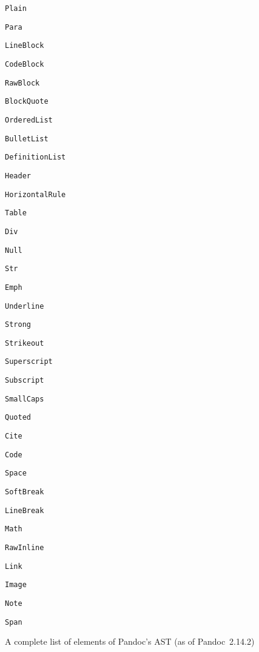 \documentclass[
  digital,     %
  oneside,     %
  nosansbold,  %
  nocolorbold, %
  lof,         %
  nolot,       %
]{fithesis4}
\begin{document}
\begin{figure}
  \centering
  \begin{multicols}{3}
    \begin{compactenum}
      \item \texttt{Plain}
      \item \texttt{Para}
      \item \texttt{LineBlock}
      \item \texttt{CodeBlock}
      \item \texttt{RawBlock}
      \item \texttt{BlockQuote}
      \item \texttt{OrderedList}
      \item \texttt{BulletList}
      \item \texttt{DefinitionList}
      \item \texttt{Header}
      \item \texttt{HorizontalRule}
      \item \texttt{Table}
      \item \texttt{Div}
      \item \texttt{Null}
      \item \texttt{Str}
      \item \texttt{Emph}
      \item \texttt{Underline}
      \item \texttt{Strong}
      \item \texttt{Strikeout}
      \item \texttt{Superscript}
      \item \texttt{Subscript}
      \item \texttt{SmallCaps}
      \item \texttt{Quoted}
      \item \texttt{Cite}
      \item \texttt{Code}
      \item \texttt{Space}
      \item \texttt{SoftBreak}
      \item \texttt{LineBreak}
      \item \texttt{Math}
      \item \texttt{RawInline}
      \item \texttt{Link}
      \item \texttt{Image}
      \item \texttt{Note}
      \item \texttt{Span}
    \end{compactenum}
  \end{multicols}
  \vspace*{-1em}
  \caption{A complete list of elements of Pandoc's AST (as of Pandoc~2.14.2)}
  \label{fig:pandoc-elems}
\end{figure}
\end{document}
